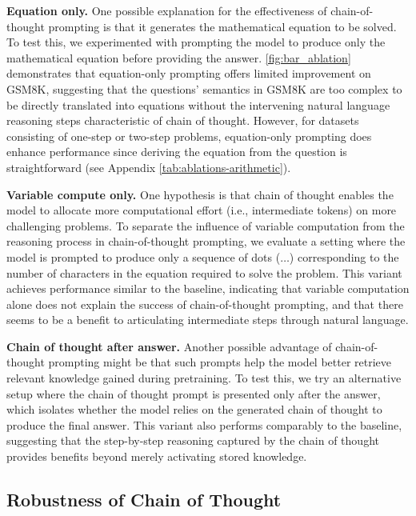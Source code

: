 \textbf{Equation only.} One possible explanation for the effectiveness of chain-of-thought prompting is that it generates the mathematical equation to be solved. To test this, we experimented with prompting the model to produce only the mathematical equation before providing the answer. \cref{fig:bar_ablation} demonstrates that equation-only prompting offers limited improvement on GSM8K, suggesting that the questions' semantics in GSM8K are too complex to be directly translated into equations without the intervening natural language reasoning steps characteristic of chain of thought. However, for datasets consisting of one-step or two-step problems, equation-only prompting does enhance performance since deriving the equation from the question is straightforward (see Appendix \cref{tab:ablations-arithmetic}).


\textbf{Variable compute only.} One hypothesis is that chain of thought enables the model to allocate more computational effort (i.e., intermediate tokens) on more challenging problems. To separate the influence of variable computation from the reasoning process in chain-of-thought prompting, we evaluate a setting where the model is prompted to produce only a sequence of dots ($\ldots$) corresponding to the number of characters in the equation required to solve the problem. This variant achieves performance similar to the baseline, indicating that variable computation alone does not explain the success of chain-of-thought prompting, and that there seems to be a benefit to articulating intermediate steps through natural language.

\textbf{Chain of thought after answer.} Another possible advantage of chain-of-thought prompting might be that such prompts help the model better retrieve relevant knowledge gained during pretraining. To test this, we try an alternative setup where the chain of thought prompt is presented only after the answer, which isolates whether the model relies on the generated chain of thought to produce the final answer. This variant also performs comparably to the baseline, suggesting that the step-by-step reasoning captured by the chain of thought provides benefits beyond merely activating stored knowledge.


\subsection{Robustness of Chain of Thought}\label{subsec:robustness}

